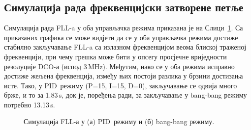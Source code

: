 \documentclass[master]{finthesis}
\def \FLL  {FLL} %
\def \DCO  {DCO} %
\def \PID  {PID} %
\def \P    {P}   %
\def \I    {I}   %
\def \D    {D}   %
\begin{document}
\subsection{Симулација рада фреквенцијски затворене петље}
Симулација рада \FLL-a у оба управљачка режима приказана је на Слици~\ref{sim_FLL}. Са приказаних графика се може видјети да се у оба управљачка режима достиже стабилно закључавање \FLL-a са излазном фреквенцијом веома блиској траженој фреквенцији, при чему грешка може бити у опсегу просјечне вриједности резолуције \DCO-а (испод 3\,MHz). Међутим, иако се у оба режима исправно достиже жељена фреквенција, између њих постоји разлика у брзини достизања исте. Тако, у \PID\ режиму (\P=15, \I=15, \D=0), закључавање се одвија много брже, и то за 1.83\,\textmu s, док је, поређења ради, за закључавање у bang-bang режиму потребно 13.13\,\textmu s.
\begin{figure}[!ht]
    \centering
    \subfloat[]{
	    
    }
    \vspace{0.2cm}
    \subfloat[]{		
	    \hspace{-0.2cm}
	    
    }	
    \caption {Симулација \FLL-а у (а) \PID\ режиму и (б) bang-bang режиму.} %
    \label{sim_FLL}
\end{figure}
\end{document}
